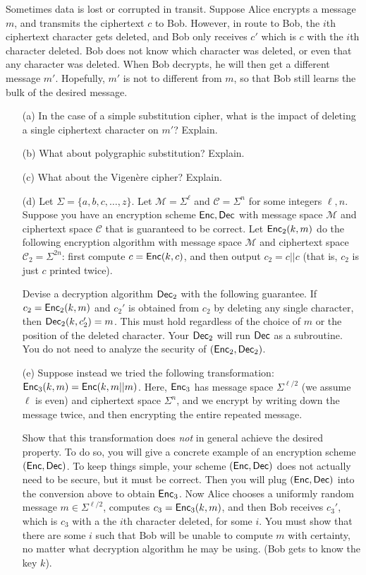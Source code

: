 Sometimes data is lost or corrupted in transit. Suppose Alice encrypts a message $m$, and transmits the ciphertext $c$ to Bob. However, in route to Bob, the $i$th ciphertext character gets deleted, and Bob only receives $c'$ which is $c$ with the $i$th character deleted. Bob does not know which character was deleted, or even that any character was deleted. When Bob decrypts, he will then get a different message $m'$. Hopefully, $m'$ is not to different from $m$, so that Bob still learns the bulk of the desired message.
\begin{itemize}
	\item[(a)] In the case of a simple substitution cipher, what is the impact of deleting a single ciphertext character on $m'$? Explain.
	\item[(b)] What about polygraphic substitution? Explain.
	\item[(c)] What about the Vigen\`ere cipher? Explain.
	\item[(d)] Let $\Sigma=\{a,b,c,\dots,z\}$. Let $\mathcal{M}=\Sigma^\ell$ and $\mathcal{C}=\Sigma^n$ for some integers $\ell,n$. Suppose you have an encryption scheme ${\sf{Enc}},{\sf{Dec}}$ with message space $\mathcal{M}$ and ciphertext space $\mathcal{C}$ that is guaranteed to be correct. Let ${\sf{Enc}}_2(k,m)$ do the following encryption algorithm with message space $\mathcal{M}$ and ciphertext space $\mathcal{C}_2=\Sigma^{2n}$: first compute $c={\sf{Enc}}(k,c)$, and then output $c_2=c||c$ (that is, $c_2$ is just $c$ printed twice).
	
	Devise a decryption algorithm ${\sf{Dec}}_2$ with the following guarantee. If $c_2={\sf{Enc}}_2(k,m)$ and $c_2'$ is obtained from $c_2$ by deleting any single character, then ${\sf{Dec}}_2(k,c_2')=m$. This must hold regardless of the choice of $m$ or the position of the deleted character. Your ${\sf{Dec}}_2$ will run ${\sf{Dec}}$ as a subroutine. You do not need to analyze the security of $({\sf{Enc}}_2,{\sf{Dec}}_2)$.
	
	\item[(e)] Suppose instead we tried the following transformation: ${\sf{Enc}}_3(k,m)={\sf{Enc}}(k,m||m)$. Here, ${\sf{Enc}}_3$ has message space $\Sigma^{\ell/2}$ (we assume $\ell$ is even) and ciphertext space $\Sigma^n$, and we encrypt by writing down the message twice, and then encrypting the entire repeated message.
	
	Show that this transformation does \emph{not} in general achieve the desired property. To do so, you will give a concrete example of an encryption scheme $({\sf{Enc}},{\sf{Dec}})$. To keep things simple, your scheme $({\sf{Enc}},{\sf{Dec}})$ does not actually need to be secure, but it must be correct. Then you will plug $({\sf{Enc}},{\sf{Dec}})$ into the conversion above to obtain ${\sf{Enc}}_3$. Now Alice chooses a uniformly random message $m\in\Sigma^{\ell/2}$, computes $c_3={\sf{Enc}}_3(k,m)$, and then Bob receives $c_3'$, which is $c_3$ with a the $i$th character deleted, for some $i$. You must show that there are some $i$ such that Bob will be unable to compute $m$ with certainty, no matter what decryption algorithm he may be using. (Bob gets to know the key $k$).
\end{itemize}



